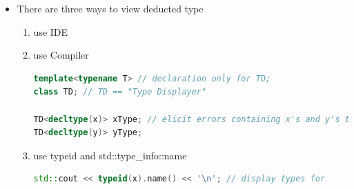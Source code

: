 \documentclass[a4paper,11pt,twoside]{book}
\begin{document}
\begin{itemize}
	\item There are three ways to view deducted type
	\begin{enumerate}
		\item use IDE
		\item use Compiler
\begin{lstlisting}[frame=single, language=c++]
template<typename T> // declaration only for TD;
class TD; // TD == "Type Displayer"

TD<decltype(x)> xType; // elicit errors containing x's and y's types
TD<decltype(y)> yType; 
\end{lstlisting}

	\item use typeid and std::type\_info::name
	
\begin{lstlisting}[frame=single, language=c++]
std::cout << typeid(x).name() << '\n'; // display types for
\end{lstlisting}
		
	\end{enumerate}
	
\end{itemize}
\end{document}
